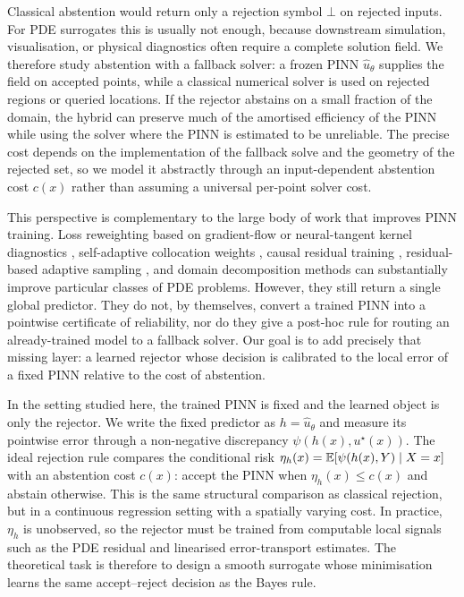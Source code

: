Classical abstention would return only a rejection symbol $\bot$ on rejected
inputs. For PDE surrogates this is usually not enough, because downstream
simulation, visualisation, or physical diagnostics often require a complete
solution field. We therefore study abstention with a fallback solver: a
frozen PINN $\widehat{u}_\theta$ supplies the field on accepted points, while
a classical numerical solver is used on rejected regions or queried
locations. If the rejector abstains on a small fraction of the domain, the
hybrid can preserve much of the amortised efficiency of the PINN while using
the solver where the PINN is estimated to be unreliable. The precise cost
depends on the implementation of the fallback solve and the geometry of the
rejected set, so we model it abstractly through an input-dependent
abstention cost $c(x)$ rather than assuming a universal per-point solver
cost.

This perspective is complementary to the large body of work that improves
PINN training. Loss reweighting based on gradient-flow or neural-tangent
kernel diagnostics \citep{wang2021understanding,wang2022whenpinns},
self-adaptive collocation weights \citep{mcclenny2023self}, causal
residual training \citep{wang2022respecting}, residual-based adaptive
sampling \citep{wu2023comprehensive,daw2023mitigating}, and domain
decomposition methods \citep{jagtap2020extended,jagtap2020conservative,
moseley2023finite} can substantially improve particular classes of PDE
problems. However, they still return a single global predictor. They do not,
by themselves, convert a trained PINN into a pointwise certificate of
reliability, nor do they give a post-hoc rule for routing an already-trained
model to a fallback solver. Our goal is to add precisely that missing layer:
a learned rejector whose decision is calibrated to the local error of a
fixed PINN relative to the cost of abstention.

In the setting studied here, the trained PINN is fixed and the learned object
is only the rejector. We write the fixed predictor as
$h=\widehat{u}_\theta$ and measure its pointwise error through a
non-negative discrepancy $\psi(h(x),u^\star(x))$. The ideal rejection rule
compares the conditional risk
$\eta_h(x)=\mathbb{E}[\psi(h(x),Y)\mid X=x]$ with an abstention cost $c(x)$:
accept the PINN when $\eta_h(x)\le c(x)$ and abstain otherwise. This is the
same structural comparison as classical rejection, but in a continuous
regression setting with a spatially varying cost. In practice, $\eta_h$ is
unobserved, so the rejector must be trained from computable local signals
such as the PDE residual and linearised error-transport estimates. The
theoretical task is therefore to design a smooth surrogate whose minimisation
learns the same accept--reject decision as the Bayes rule.

